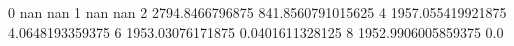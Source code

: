 0 nan nan
1 nan nan
2 2794.8466796875 841.8560791015625
4 1957.055419921875 4.0648193359375
6 1953.03076171875 0.0401611328125
8 1952.9906005859375 0.0
